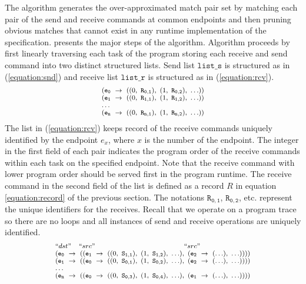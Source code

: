 The algorithm generates the over-approximated match pair set by matching each pair of the send and receive commands at common endpoints and then pruning obvious matches that cannot exist in any runtime implementation of the specification.  presents the major steps of the algorithm. Algorithm proceeds by first linearly traversing each task of the program storing each receive and send command into two distinct structured lists. Send list $\mathtt{list\_s}$ is structured as in (\ref{equation:snd}) and receive list $\mathtt{list\_r}$ is structured as in (\ref{equation:rcv}).
\begin{equation}
\footnotesize \begin{array}{l}
(\mathtt{e_0}\ \rightarrow\ ((0,\ \mathtt{R_{0,1}}),\ (1,\ \mathtt{R_{0,2}}),\ \ldots))\\
(\mathtt{e_1}\ \rightarrow\ ((0,\ \mathtt{R_{1,1}}),\ (1,\ \mathtt{R_{1,2}}),\ \ldots))\\
\ldots \\
(\mathtt{e_n}\ \rightarrow\ ((0,\ \mathtt{R_{n,1}}),\ (1,\ \mathtt{R_{n,2}}),\ \ldots))\\
\end{array}
\label{equation:rcv}
\end{equation}
The list in (\ref{equation:rcv}) keeps record of the receive commands uniquely identified by the endpoint $\mathit{e}_x$, where $x$ is the number of the endpoint. The integer in the first field of each pair indicates the program order of the receive commands within each task on the specified endpoint. Note that the receive command with lower program order should be served first in the program runtime. The receive command in the second field of the list is defined as a record $R$ in equation \ref{equation:record} of the previous section. The notations $\mathtt{R_{0,1}}$, $\mathtt{R_{0,2}}$, etc. represent the unique identifiers for the receives. Recall that we operate on a program trace so there are no loops and all instances of send and receive operations are uniquely identified.
\begin{equation}
\footnotesize \begin{array}{l}
 ``dst" \;\;\;\; ``src" \;\;\;\;\;\;\;\;\;\;\;\;\;\;\;\;\;\;\;\;\;\;\;\;\;\;\;\;\;\;\;\;\;\;\;\;\;\;\;\;\;\;\;\;\;\; ``src"\\
(\mathtt{e_0}\ \rightarrow\ ((\mathtt{e_1}\ \rightarrow\ ((0,\ \mathtt{S_{1,1}}),\ (1,\ \mathtt{S_{1,2}}),\ \ldots),\ (\mathtt{e_2}\ \rightarrow\ (\ldots),\ \ldots))))\\
(\mathtt{e_1}\ \rightarrow\ ((\mathtt{e_0}\ \rightarrow\ ((0,\ \mathtt{S_{0,1}}),\ (1,\ \mathtt{S_{0,2}}),\ \ldots),\ (\mathtt{e_2}\ \rightarrow\ (\ldots),\ \ldots))))\\
 \dots\\
(\mathtt{e_n}\ \rightarrow\ ((\mathtt{e_0}\ \rightarrow\ ((0,\ \mathtt{S_{0,3}}),\ (1,\ \mathtt{S_{0,4}}),\ \ldots),\ (\mathtt{e_1}\ \rightarrow\ (\ldots),\ \ldots))))\\
\end{array}
\label{equation:snd}
\end{equation}
